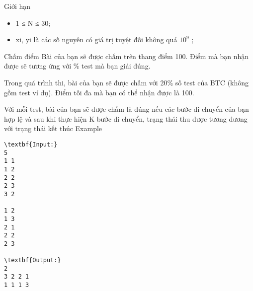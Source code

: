 Giới hạn
\begin{itemize}
	\item     1 ≤ N ≤ 30;   
	\item     xi, yi là các số nguyên có giá trị tuyệt đối không quá $10^{9}$    ;   
\end{itemize}
Chấm điểm
Bài của bạn sẽ được chấm trên thang điểm 100. Điểm mà bạn nhận được sẽ tương ứng với \% test mà bạn giải đúng.  

   Trong quá trình thi, bài của bạn sẽ được chấm với 20\% số test của BTC (không gồm test ví dụ). Điểm tối đa mà bạn có thể nhận được là 100.  

   Với mỗi test, bài của bạn sẽ được chấm là đúng nếu các bước di chuyển của bạn hợp lệ và sau khi thực hiện K bước di chuyển, trạng thái thu được tương đương với trạng thái kết thúc
Example
\begin{verbatim}
\textbf{Input:}
5
1 1
1 2
2 2
2 3
3 2

1 2
1 3
2 1
2 2
2 3

\textbf{Output:}
2
3 2 2 1
1 1 1 3
\end{verbatim}